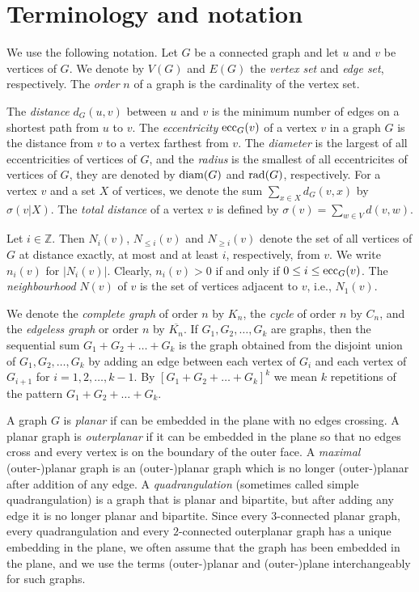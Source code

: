 \documentclass[a4paper,11pt]{article}
\begin{document}
\section{Terminology and notation}
\label{section:terminology}

We use the following notation. 
Let $G$ be a connected graph and let $u$ and $v$ be vertices of $G$.
We denote by $V(G)$ and $E(G)$ the {\em vertex set} and {\em edge set}, respectively.  
The {\em order} $n$ of a graph is  the cardinality of the vertex set. 

The {\em distance} $d_G(u,v)$ between $u$ and $v$ is the minimum number of edges
on a shortest path from $u$ to $v$. 
The {\em eccentricity} ${\rm ecc}_G(v)$ of a vertex $v$ in a graph $G$ is the distance 
from $v$ to a vertex farthest from $v$. The {\em diameter} is the largest of all
eccentricities of vertices of $G$, and the {\em radius} is the smallest of all
eccentricites of vertices of $G$, they are  denoted by 
${\rm diam}(G)$ and ${\rm rad}(G)$, respectively.
For a vertex $v$ and a set $X$ of vertices, we denote the sum $\sum_{x \in X} d_{G}(v, x)$ by $\sigma(v|X)$.
The {\em total distance} of a vertex $v$ is defined by 
$\sigma(v) = \sum_{w \in V}d(v,w)$.


Let $i\in \mathbb{Z}$. Then $N_i(v)$, $N_{\leq i}(v)$ and $N_{\geq i}(v)$ denote the set of all 
vertices of $G$ at distance exactly, at most and at least $i$, respectively, from $v$.  
We write $n_i(v)$ for $|N_i(v)|$. Clearly, $n_i(v) >0$ if and only if $0\leq i \leq {\rm ecc}_G(v)$. 
The {\em neighbourhood} $N(v)$ of $v$ is the set of vertices adjacent to $v$, i.e., $N_1(v)$.



We denote the {\em complete graph} of order $n$ by $K_n$, the {\em cycle} of order $n$ by
$C_n$,  and the {\em edgeless graph} or order $n$ by $\overline{K_n}$.
If $G_1, G_2,\ldots,G_k$ are graphs, then the sequential sum $G_1 + G_2+ \ldots + G_k$ is
the graph obtained from the disjoint union of $G_1, G_2,\ldots, G_k$ by adding an edge between each 
vertex of $G_i$ and each vertex of $G_{i+1}$ for $i=1,2,\ldots,k-1$. 
By $[G_1+G_2+\ldots+G_k]^{k}$ we mean $k$ repetitions of the pattern $G_1+G_2+\ldots+G_k$. 
 

A graph $G$ is {\em planar} if can be embedded in the plane with no edges crossing. 
A planar graph is {\em outerplanar} if it can be embedded in the plane so that no edges 
cross and every vertex is on the boundary of the outer face. 
A {\em maximal} (outer-)planar graph is an (outer-)planar graph which is no longer (outer-)planar 
after addition of any edge. A {\em quadrangulation} (sometimes called simple quadrangulation) is
a graph that is planar and bipartite, but after adding any edge it is no longer planar and bipartite.
Since every $3$-connected planar graph, every quadrangulation and every $2$-connected outerplanar
graph has a unique embedding in
the plane, we often assume that the graph has been embedded in the plane, and we use
the terms (outer-)planar and (outer-)plane interchangeably for such graphs.    
\end{document}
